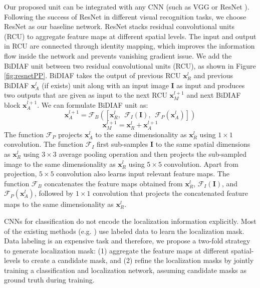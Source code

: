 \documentclass[10pt,twocolumn,letterpaper]{article}
\begin{document}
Our proposed unit can be integrated with any CNN (such as VGG \cite{simonyan2014very} or ResNet \cite{ResNet}). Following the success of ResNet \cite{ResNet} in different visual recognition tasks, we choose ResNet as our baseline network. ResNet stacks residual convolutional units (RCU) to aggregate feature maps at different spatial levels. The input and output in RCU are connected through identity mapping, which improves the information flow inside the network and prevents vanishing gradient issue. We add the BiDIAF unit between two residual convolutional units (RCU), as shown in Figure \ref{fig:resnetPP}. BiDIAF takes the output of previous RCU $\mathbf{x}_R^{l}$ and previous BiDIAF $\mathbf{x}_A^{l}$ (if exists) unit along with an input image $\mathbf{I}$ as input and produces two outputs that are given as input to the next RCU $\mathbf{x}_M^{l+1}$ and next BiDIAF block $\mathbf{x}_A^{l+1}$. We can formulate BiDIAF unit as:
\begin{equation}
\mathbf{x}_A^{l+1} = \mathcal{F}_{B}\left(\left[\mathbf{x}_R^{l}, \ \ \mathcal{F}_{I}\left(\mathbf{I} \right),\ \ \mathcal{F}_{P}\left(\mathbf{x}_A^{l}\right)\right] \right)
\end{equation}
\begin{equation}
\mathbf{x}_M^{l+1} = \mathbf{x}_R^{l} + \mathbf{x}_A^{l+1}
\label{eq:bidiaf}
\end{equation}
The function $\mathcal{F}_{P}$ projects $\mathbf{x}_A^{l}$ to the same dimensionality as $\mathbf{x}_R^{l}$ using  $1\times 1$ convolution. The function $\mathcal{F}_{I}$ first sub-samples $\mathbf{I}$ to the same spatial dimensions as $\mathbf{x}_R^{l}$ using $3\times3$ average pooling operation and then projects the sub-sampled image to the same dimensionality as $\mathbf{x}_R^{l}$ using $5\times 5$ convolution. Apart from projection, $5\times 5$ convolution also learns input relevant feature maps. The function $\mathcal{F}_{B}$ concatenates the feature maps obtained from $\mathbf{x}_R^{l}$, $\mathcal{F}_{I}\left(\mathbf{I} \right)$, and $\mathcal{F}_{P}\left(\mathbf{x}_A^{l}\right)$, followed by $1\times1$ convolution that projects the concatenated feature maps to the same dimensionality as $\mathbf{x}_R^{l}$.

CNNs for classification do not encode the localization information explicitly. Most of the existing methods (e.g. \cite{he2017maskrcnn,hariharan2015hypercolumns,ghiasi2016laplacian, shelhamer2017fully, badrinarayanan2017segnet, noh2015learning, yu2015multi, chen2016deeplab}) use labeled data to learn the localization mask. Data labeling is an expensive task and therefore, we propose a two-fold strategy to generate localization mask: (1) aggregate the feature maps at different spatial-levels to create a candidate mask, and (2) refine the localization masks by jointly training a classification and localization network, assuming candidate masks as ground truth during training.
\end{document}
